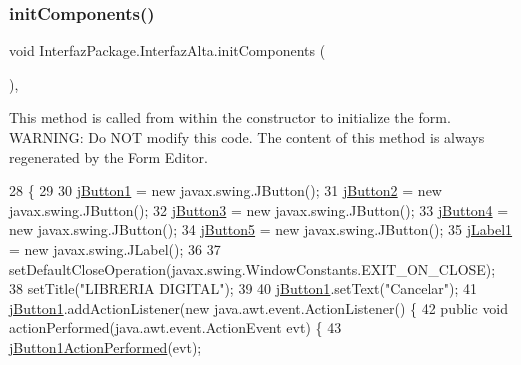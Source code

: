 \subsubsection{\texorpdfstring{init\+Components()}{initComponents()}}
{\footnotesize\ttfamily void Interfaz\+Package.\+Interfaz\+Alta.\+init\+Components (\begin{DoxyParamCaption}{ }\end{DoxyParamCaption})\hspace{0.3cm}{\ttfamily [inline]}, {\ttfamily [private]}}

This method is called from within the constructor to initialize the form. W\+A\+R\+N\+I\+NG\+: Do N\+OT modify this code. The content of this method is always regenerated by the Form Editor. 
\begin{DoxyCode}
28                                   \{
29 
30         \mbox{\hyperlink{class_interfaz_package_1_1_interfaz_alta_a04cc5364c89f6cbda8e46022ea7ddbf4}{jButton1}} = \textcolor{keyword}{new} javax.swing.JButton();
31         \mbox{\hyperlink{class_interfaz_package_1_1_interfaz_alta_a1657bb8744ea591f1eb9e70c5c570169}{jButton2}} = \textcolor{keyword}{new} javax.swing.JButton();
32         \mbox{\hyperlink{class_interfaz_package_1_1_interfaz_alta_a2bce273c449eda774b687351d594071c}{jButton3}} = \textcolor{keyword}{new} javax.swing.JButton();
33         \mbox{\hyperlink{class_interfaz_package_1_1_interfaz_alta_a1766bf9cf73dcb04fa55a88750a864f5}{jButton4}} = \textcolor{keyword}{new} javax.swing.JButton();
34         \mbox{\hyperlink{class_interfaz_package_1_1_interfaz_alta_a368946c13229a442a7633f37c8fa0425}{jButton5}} = \textcolor{keyword}{new} javax.swing.JButton();
35         \mbox{\hyperlink{class_interfaz_package_1_1_interfaz_alta_a353b3664adfc462e1ec4be9e78f5da33}{jLabel1}} = \textcolor{keyword}{new} javax.swing.JLabel();
36 
37         setDefaultCloseOperation(javax.swing.WindowConstants.EXIT\_ON\_CLOSE);
38         setTitle(\textcolor{stringliteral}{"LIBRERIA DIGITAL"});
39 
40         \mbox{\hyperlink{class_interfaz_package_1_1_interfaz_alta_a04cc5364c89f6cbda8e46022ea7ddbf4}{jButton1}}.setText(\textcolor{stringliteral}{"Cancelar"});
41         \mbox{\hyperlink{class_interfaz_package_1_1_interfaz_alta_a04cc5364c89f6cbda8e46022ea7ddbf4}{jButton1}}.addActionListener(\textcolor{keyword}{new} java.awt.event.ActionListener() \{
42             \textcolor{keyword}{public} \textcolor{keywordtype}{void} actionPerformed(java.awt.event.ActionEvent evt) \{
43                 \mbox{\hyperlink{class_interfaz_package_1_1_interfaz_alta_a70858cd5c6c13a2e218388ace83d9041}{jButton1ActionPerformed}}(evt);

\end{DoxyCode}
